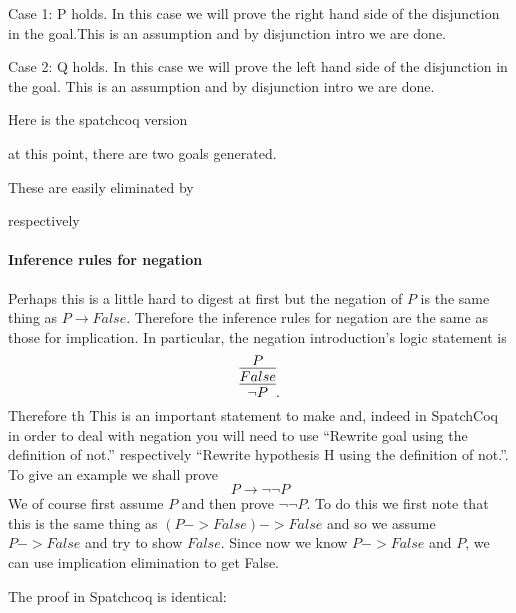 \begin{itemize}
Case 1: P holds. In this case we will prove the right hand side of the disjunction in the goal.This is an assumption and by disjunction intro we are done.

Case 2: Q holds. In this case we will prove the left hand side of the disjunction in the goal. This is an assumption  and by disjunction intro we are done.

Here is the spatchcoq version


at this point, there are two goals generated.


These are easily eliminated by

respectively 



\paragraph{Inference rules for negation}

Perhaps this is a little hard to digest at first but the negation of $P$ is the same thing as $P\rightarrow False$. Therefore the inference rules for negation are the same as those for implication. In particular, the negation introduction's logic statement is
$$\infer{\neg P}{\infer{False}{P}}.$$
Therefore th This is an important statement to make and, indeed in SpatchCoq in order to deal with negation you will need to use ``Rewrite goal using the definition of not.'' respectively ``Rewrite hypothesis	H using the definition of not.''. To give an example we shall prove 
$$P \rightarrow \neg \neg P$$
We of course first assume $P$ and then prove $\neg \neg P$. To do this we first note that this is the same thing as $(P->False)->False$ and so we assume $P->False$ and try to show $False$. Since now we know $P->False$ and $P$, we can use implication elimination to get False.




The proof in Spatchcoq is identical:


\end{itemize}


